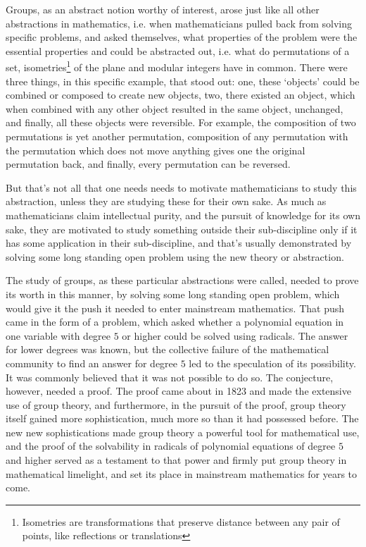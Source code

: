 \documentclass[12pt, titlepage]{article}
\theoremstyle{definition}
\begin{document}
Groups, as an abstract notion worthy of interest, arose just like all other abstractions in mathematics, i.e. when mathematicians pulled back from solving specific problems, and asked themselves, what properties of the problem were the essential properties and could be abstracted out, i.e. what do permutations of a set, isometries\footnote{Isometries are transformations that preserve distance between any pair of points, like reflections or translations} of the plane and modular integers have in common. There were three things, in this specific example, that stood out: one, these `objects' could be combined or composed to create new objects, two, there existed an object, which when combined with any other object resulted in the same object, unchanged, and finally, all these objects were reversible. For example, the composition of two permutations is yet another permutation, composition of any permutation with the permutation which does not move anything gives one the original permutation back, and finally, every permutation can be reversed.

But that's not all that one needs needs to motivate mathematicians to study this abstraction, unless they are studying these for their own sake. As much as mathematicians claim intellectual purity, and the pursuit of knowledge for its own sake, they are motivated to study something outside their sub-discipline only if it has some application in their sub-discipline, and that's usually demonstrated by solving some long standing open problem using the new theory or abstraction.

The study of groups, as these particular abstractions were called, needed to prove its worth in this manner, by solving some long standing open problem, which would give it the push it needed to enter mainstream mathematics. That push came in the form of a problem, which asked whether a polynomial equation in one variable with degree $5$ or higher could be solved using radicals. The answer for lower degrees was known, but the collective failure of the mathematical community to find an answer for degree $5$ led to the speculation of its possibility. It was commonly believed that it was not possible to do so. The conjecture, however, needed a proof. The proof came about in 1823 and made the extensive use of group theory, and furthermore, in the pursuit of the proof, group theory itself gained more sophistication, much more so than it had possessed before. The new new sophistications made group theory a powerful tool for mathematical use, and the proof of the solvability in radicals of polynomial equations of degree $5$ and higher served as a testament to that power and firmly put group theory in mathematical limelight, and set its place in mainstream mathematics for years to come.
\end{document}
